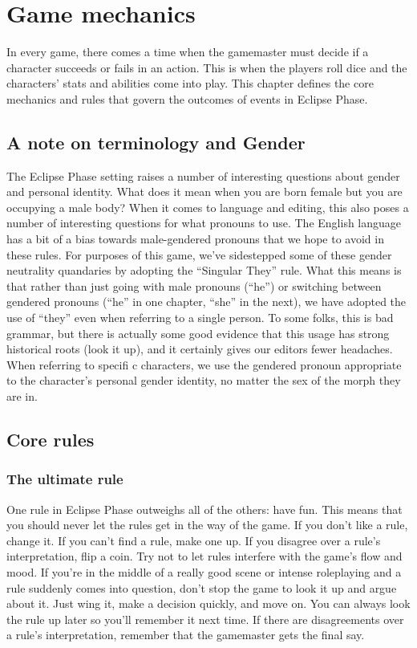 \chapter{Game mechanics} \label{chap:game-mechanics} 

In every game, there comes a time when the gamemaster must decide if a character succeeds or fails in an action. This is when the players roll dice and the characters' stats and abilities come into play. This chapter defines the core mechanics and rules that govern the outcomes of events in Eclipse Phase. 

\section{A note on terminology and Gender} The Eclipse Phase setting raises a number of interesting questions about gender and personal identity. What does it mean when you are born female but you are occupying a male body? When it comes to language and editing, this also poses a number of interesting questions for what pronouns to use. The English language has a bit of a bias towards male-gendered pronouns that we hope to avoid in these rules. For purposes of this game, we’ve sidestepped some of these gender neutrality quandaries by adopting the “Singular They” rule. What this means is that rather than just going with male pronouns (“he”) or switching between gendered pronouns (“he” in one chapter, “she” in the next), we have adopted the use of “they” even when referring to a single person. To some folks, this is bad grammar, but there is actually some good evidence that this usage has strong historical roots (look it up), and it certainly gives our editors fewer headaches. When referring to specifi c characters, we use the gendered pronoun appropriate to the character’s personal gender identity, no matter the sex of the morph they are in. 



\section{Core rules} \label{sec:basics} 

\subsection{The ultimate rule} \label{sec:ultimate-rule} 

One rule in Eclipse Phase outweighs all of the others: have fun. This means that you should never let the rules get in the way of the game. If you don't like a rule, change it. If you can't find a rule, make one up. If you disagree over a rule's interpretation, flip a coin. Try not to let rules interfere with the game's flow and mood. If you're in the middle of a really good scene or intense roleplaying and a rule suddenly comes into question, don't stop the game to look it up and argue about it. Just wing it, make a decision quickly, and move on. You can always look the rule up later so you'll remember it next time. If there are disagreements over a rule's interpretation, remember that the gamemaster gets the final say. 

